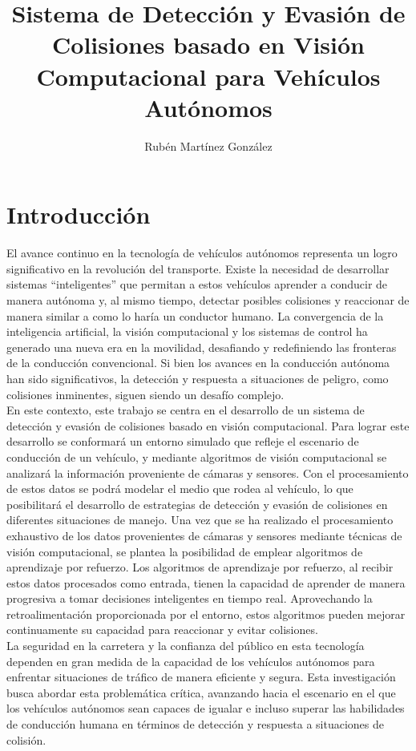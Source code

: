 \documentclass[10pt,letterpaper,final]{article}
\begin{document}
    \title{Sistema de Detección y Evasión de Colisiones basado en Visión Computacional para Vehículos Autónomos}
    \author{Rubén Martínez González}
    \maketitle
    \clearpage
    \section*{Introducción}
    \noindent
    El avance continuo en la tecnología de vehículos autónomos representa un logro significativo en la revolución del transporte.
    Existe la necesidad de desarrollar sistemas ``inteligentes'' que permitan a estos vehículos aprender a conducir de manera autónoma y,
    al mismo tiempo, detectar posibles colisiones y reaccionar de manera similar a como lo haría un conductor humano.
    La convergencia de la inteligencia artificial, la visión computacional y los sistemas de control ha generado una nueva era en la movilidad,
    desafiando y redefiniendo las fronteras de la conducción convencional.
    Si bien los avances en la conducción autónoma han sido significativos, la detección y respuesta a
    situaciones de peligro, como colisiones inminentes, siguen siendo un desafío complejo.\\ \newline
    En este contexto, este trabajo se centra en el desarrollo de un sistema de detección y evasión de colisiones basado en visión computacional.
    Para lograr este desarrollo se conformará un entorno simulado que refleje el escenario de conducción de un vehículo,
    y mediante algoritmos de visión computacional se analizará la información proveniente de cámaras y sensores.
    Con el procesamiento de estos datos se podrá modelar el medio que rodea al vehículo, lo que posibilitará
    el desarrollo de estrategias de detección y evasión de colisiones en diferentes situaciones de manejo.
    Una vez que se ha realizado el procesamiento exhaustivo de los datos provenientes de cámaras y sensores mediante técnicas de visión computacional,
    se plantea la posibilidad de emplear algoritmos de aprendizaje por refuerzo.
    Los algoritmos de aprendizaje por refuerzo, al recibir estos datos procesados como entrada, tienen la capacidad de aprender de manera progresiva
    a tomar decisiones inteligentes en tiempo real.
    Aprovechando la retroalimentación proporcionada por el entorno, estos algoritmos pueden mejorar continuamente su capacidad para reaccionar y evitar colisiones.\\ \newline
    La seguridad en la carretera y la confianza del público en esta tecnología dependen en gran medida de la capacidad
    de los vehículos autónomos para enfrentar situaciones de tráfico de manera eficiente y segura.
    Esta investigación busca abordar esta problemática crítica, avanzando hacia el escenario en el que los vehículos autónomos
    sean capaces de igualar e incluso superar las habilidades de conducción humana en términos de detección y respuesta
    a situaciones de colisión.
    \clearpage
    
\end{document}
